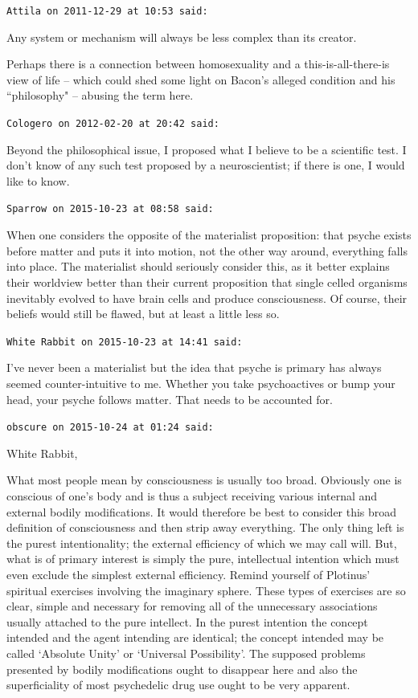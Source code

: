 \begin{footnotesize}
\begin{sffamily}
\hfill

\texttt{Attila on 2011-12-29 at 10:53 said: }

Any system or mechanism will always be less complex than its creator.

Perhaps there is a connection between homosexuality and a this-is-all-there-is view of life – which could shed some light on Bacon's alleged condition and his ``philosophy" – abusing the term here. 


\hfill

\texttt{Cologero on 2012-02-20 at 20:42 said: }

Beyond the philosophical issue, I proposed what I believe to be a scientific test. I don't know of any such test proposed by a neuroscientist; if there is one, I would like to know.


\hfill

\texttt{Sparrow on 2015-10-23 at 08:58 said: }

When one considers the opposite of the materialist proposition: that psyche exists before matter and puts it into motion, not the other way around, everything falls into place. The materialist should seriously consider this, as it better explains their worldview better than their current proposition that single celled organisms inevitably evolved to have brain cells and produce consciousness. Of course, their beliefs would still be flawed, but at least a little less so.


\hfill

\texttt{White Rabbit on 2015-10-23 at 14:41 said: }

I've never been a materialist but the idea that psyche is primary has always seemed counter-intuitive to me. Whether you take psychoactives or bump your head, your psyche follows matter. That needs to be accounted for.


\hfill

\texttt{obscure on 2015-10-24 at 01:24 said: }

White Rabbit,

What most people mean by consciousness is usually too broad. Obviously one is conscious of one's body and is thus a subject receiving various internal and external bodily modifications. It would therefore be best to consider this broad definition of consciousness and then strip away everything. The only thing left is the purest intentionality; the external efficiency of which we may call will. But, what is of primary interest is simply the pure, intellectual intention which must even exclude the simplest external efficiency. Remind yourself of Plotinus' spiritual exercises involving the imaginary sphere. These types of exercises are so clear, simple and necessary for removing all of the unnecessary associations usually attached to the pure intellect. In the purest intention the concept intended and the agent intending are identical; the concept intended may be called `Absolute Unity' or `Universal Possibility'. The supposed problems presented by bodily modifications ought to disappear here and also the superficiality of most psychedelic drug use ought to be very apparent.


\end{sffamily}
\end{footnotesize}
